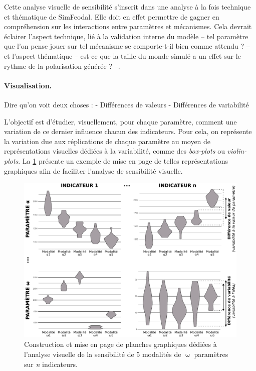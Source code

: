 Cette analyse visuelle de sensibilité s'inscrit dans une analyse à la fois technique et thématique de SimFeodal.
Elle doit en effet permettre de gagner en compréhension sur les interactions entre paramètres et mécanismes.
Cela devrait éclairer l'aspect technique, lié à la validation interne du modèle -- tel paramètre que l'on pense jouer sur tel mécanisme se comporte-t-il bien comme attendu ? -- et l'aspect thématique -- est-ce que la taille du monde simulé a un effet sur le rythme de la polarisation générée ? --.


\paragraph{Visualisation.}

Dire qu'on voit deux choses : 
- Différences de valeurs
- Différences de variabilité

L'objectif est d'étudier, visuellement, pour chaque paramètre, comment une variation de ce dernier influence chacun des indicateurs.
Pour cela, on représente la variation due aux réplications de chaque paramètre au moyen de représentations visuelles dédiées à la variabilité, comme des \textit{box-plots} ou \textit{violin-plots}.
La \cref{fig:exemple-visu-sensib} présente un exemple de mise en page de telles représentations graphiques afin de faciliter l'analyse de sensibilité visuelle.
\begin{figure}[H]
	\centering
	\includegraphics[width=\linewidth]{img/schema_violinplots_sensib.pdf}
	\caption{Construction et mise en page de planches graphiques dédiées à l'analyse visuelle de la sensibilité de 5 modalités de $\upomega$ paramètres sur \textit{n} indicateurs.}
	\label{fig:exemple-visu-sensib}
\end{figure}

